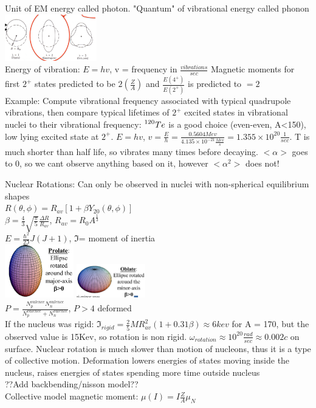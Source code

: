 \documentclass{article}
\begin{document}
\begin{multicols}{3}
Unit of EM energy called photon.  "Quantum" of vibrational energy called phonon\\
\includegraphics[width=4cm]{images/vibrations.jpg}\\
Energy of vibration: $E = hv$, v = frequency in $\frac{vibrations}{sec}$
Magnetic moments for first $2^{+}$ states predicted to be $2(\frac{Z}{A})$ and $\frac{E(4^{+})}{E(2^{+})}$ is predicted to $=2$ \\
Example:  Compute vibrational frequency associated with typical quadrupole vibrations, then compare typical lifetimes of $2^{+}$ excited states in vibrational nuclei to their vibrational frequency:  $\prescript{120}{}{Te}$ is a good choice (even-even, A<150), low lying excited state at $2^{+}$.  $E = hv$, $v = \frac{E}{h} = \frac{0.5604Mev}{4.135\times10^{-21}\frac{Mev}{s}} = 1.355\times10^{20}\frac{1}{sec}$.  T is much shorter than half life, so vibrates many times before decaying. $<\alpha>$ goes to 0, so we cant observe anything based on it, however $<\alpha^{2}>$ does not!

Nuclear Rotations:  Can only be observed in nuclei with non-spherical equilibrium shapes\\
$R(\theta,\phi) = R_{av}[1+\beta Y_{20}(\theta,\phi)]$\\
$\beta = \frac{4}{3} \sqrt{\frac{\pi}{5}} \frac{\Delta R}{R_{av}}$, $R_{av} = R_{0}A^{\frac{1}{3}}$\\
$E = \frac{\hbar^{2}}{2\Im}J(J+1)$, $\Im$= moment of inertia\\
\includegraphics[width=3cm]{images/prolate.png}
\includegraphics[width=3cm]{images/oblate.png}\\
$P = \frac{N_{p}^{valence}N_{n}^{valence}}{N_{p}^{valence}+N_{n}^{valence}}$, $P>4$ deformed\\
If the nucleus was rigid: $\Im_{rigid} = \frac{2}{5}MR_{av}^{2}(1+0.31\beta) \approx 6 kev$ for A = 170, but the observed value is 15Kev, so rotation is non rigid.  $\omega_{rotation} \approx 10^{20} \frac{rad}{sec} \approx 0.002c$ on surface.  Nuclear rotation is much slower than motion of nucleons, thus it is a type of collective motion. Deformation lowers energies of states moving inside the nucleus, raises energies of states spending more time outside nucleus\\??Add backbending/nisson model??\\
Collective model magnetic moment: 
$\mu (I) = I \frac{Z}{A} \mu_{N}$\\


\end{multicols}
\end{document}
